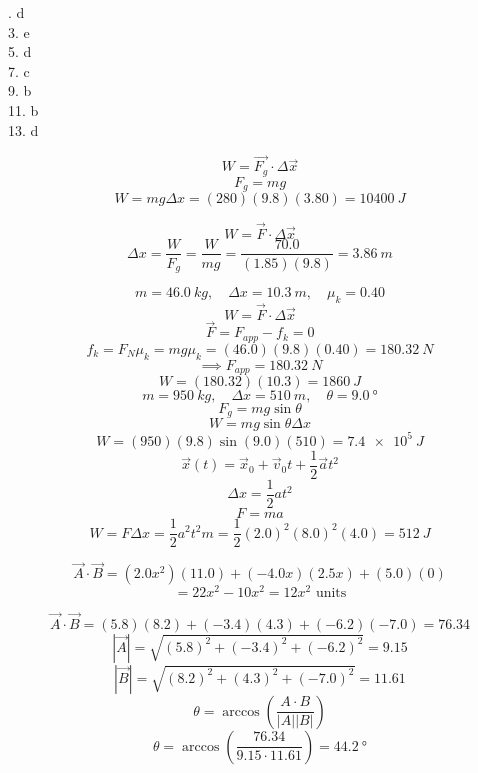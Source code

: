 \documentclass[11pt]{homework}
\begin{document}
\maketitle

\renewcommand{\questiontype}{MisConcQ}
\setcounter{questionCounter}{0}

. d\\
3. e\\
5. d\\
7. c\\
9. b\\
11. b\\
13. d

\renewcommand{\questiontype}{Problem}
\setcounter{questionCounter}{0}

\question
\[    
W= \vec{F_g}\cdot\Delta \vec{x}
\]\[
F_g = mg 
\]\[
W = mg \Delta x  = (280)(9.8)(3.80) = \boxed{\qty{10400}{J}}
\]

\question
\[
W = \vec{F}\cdot \Delta\vec{x}
\] \[
\Delta x = \frac{W}{F_g} = \frac{W}{mg} = \frac{70.0}{(1.85)(9.8)} = \boxed{\qty{3.86}{m}}
\]

\setcounter{questionCounter}{4}
\question
\[
m = \qty{46.0}{kg}, \quad \Delta x = \qty{10.3}{m}, \quad \mu_k = 0.40
\]\[
W = \vec{F}\cdot \Delta\vec{x}
\]\[
\vec{F}=F_{app} - f_k = 0
\]\[
f_k = F_N\mu_k = mg\mu_k = (46.0)(9.8)(0.40) = \qty{180.32}{N}
\] \[
\implies F_{app} = \qty{180.32}{N}
\]\[
W = (180.32)(10.3) = \boxed{\qty{1860}{J}}
\]
\setcounter{questionCounter}{7}
\question
\[
    m = \qty{950}{kg}, \quad \Delta x = \qty{510}{m}, \quad \theta = \qty{9.0}{\degree}
\]\[
F_g=mg \sin \theta
\]\[
W = mg \sin \theta \Delta x
\]
\[
    W = (950)(9.8)\sin(9.0)(510) = \boxed{\qty{7.4e5}{J}}
\]
\setcounter{questionCounter}{11}
\question
\[
\vec x(t)=\vec x_0+\vec v_0t+\frac{1}{2}\vec at^2
\]\[
    \Delta x = \frac{1}{2}at^2 
\]\[
F = ma
\]
\[
    W = F\Delta x = \frac{1}{2}a^2t^2m = \frac{1}{2}(2.0)^2(8.0)^2(4.0) = \boxed{\qty{512}{J}}
\]

\setcounter{questionCounter}{17}
\question
\[
    \vec{A} \cdot \vec{B} = (2.0x^2)(11.0) + (-4.0x)(2.5x) + (5.0)(0) 
\]
\[
    = 22x^2 - 10x^2 = \boxed{12x^2 \text{ units}}
\]

\setcounter{questionCounter}{19}
\question
\[
    \vec{A} \cdot \vec{B} = (5.8)(8.2) + (-3.4)(4.3) + (-6.2)(-7.0) = 76.34
\]\[
|\vec{A}| = \sqrt{(5.8)^2+(-3.4)^2+(-6.2)^2} = 9.15
\]\[
|\vec{B}| = \sqrt{(8.2)^2+(4.3)^2+(-7.0)^2} = 11.61
\]\[
\theta = \arccos\left(\frac{A \cdot B}{|A||B|}\right) 
\]
\[
    \theta = \arccos\left(\frac{76.34}{9.15 \cdot 11.61}\right) = \boxed{\qty{44.2}{\degree}} 
\]
\end{document}
